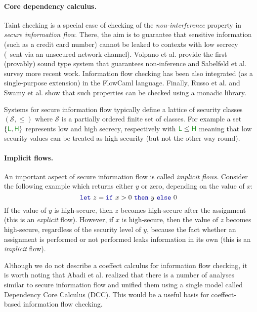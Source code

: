 
\paragraph{Core dependency calculus.}
Taint checking is a special case of checking of the \emph{non-interference} property
in \emph{secure information flow}. There, the aim is to guarantee that sensitive information (such
as a credit card number) cannot be leaked to contexts with low secrecy (\eg~sent via an unsecured
network channel). Volpano et al. \cite{app-secure-flow} provide the first (provably) sound type
system that guarantees non-inference and Sabelfeld et al. \cite{app-secure-information-flow} survey
more recent work. Information flow checking has been also integrated (as a single-purpose
extension) in the FlowCaml \cite{app-security-flowcaml} language. Finally, Russo et al. and
Swamy et al. \cite{monad-secure-flow,monads-lightweight-ml} show that such properties can be checked
using a monadic library.

Systems for secure information flow typically define a lattice of security classes $(\mathcal{S}, \leq)$
where $\mathcal{S}$ is a partially ordered finite set of classes. For example a set $\{\cclrd{\ident{L}}, \cclrd{\ident{H}}\}$
represents low and high secrecy, respectively with $\cclrd{\ident{L}} \leq \cclrd{\ident{H}}$ meaning that low security
values can be treated as high security (but not the other way round).

\paragraph{Implicit flows.}
An important aspect of secure information flow is called \emph{implicit flows}. Consider the following
example which returns either $y$ or zero, depending on the value of $x$:
%
\begin{equation*}
\kvd{let}~z = \kvd{if}~x>0~\kvd{then}~y~\kvd{else}~0
\end{equation*}
%
If the value of $y$ is high-secure, then $z$ becomes high-secure after the assignment
(this is an \emph{explicit} flow). However, if $x$ is high-secure, then the value of
$z$ becomes high-secure, regardless of the security level of $y$, because the fact whether an
assignment is performed or not performed leaks information in its own (this is an
\emph{implicit} flow).

Although we do not describe a coeffect calculus for information flow checking, it is worth noting
that Abadi et al. \cite{app-dcc} realized that there is a number of analyses similar to secure information
flow and unified them using a single model called Dependency Core Calculus (DCC). This would be
a useful basis for coeffect-based information flow checking.

